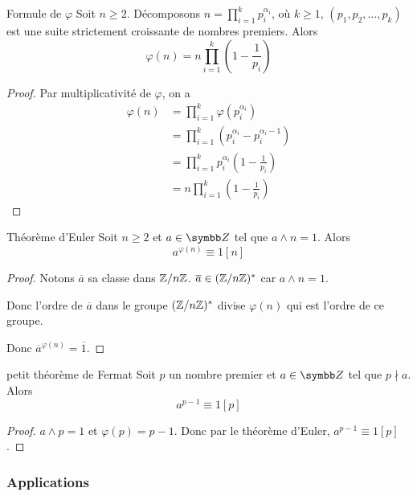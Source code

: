 \begin{theoreme}{Formule de $\varphi$}{}
    Soit $n \geqslant 2$. Décomposons $\displaystyle n = \prod_{i = 1}^k p_i^{\alpha_i}$, où 
    $k \geqslant 1$, $(p_1, p_2, \ldots, p_k)$ est une suite strictement croissante de nombres premiers. 
    Alors \[\varphi(n) = n \prod_{i = 1}^k \left(1 - \frac 1 {p_i}\right)\]
\end{theoreme}

\begin{proof}
    Par multiplicativité de $\varphi$, on a
    \begin{align*}
        \varphi(n) & = \prod_{i = 1}^k \varphi(p_i^{\alpha_i}) \\
        & = \prod_{i = 1}^k \left(p_i^{\alpha_i} - p_i^{\alpha_i - 1}\right) \\
        & = \prod_{i = 1}^k p_i^{\alpha_i} \left( 1 - \frac 1 {p_i} \right) \\
        & = n \prod_{i = 1}^k \left(1 - \frac 1 {p_i}\right)
    \end{align*}
\end{proof}

\begin{theoreme}{Théorème d'Euler}{}
    Soit $n \geqslant 2$ et $a \in \Z$ tel que $a \wedge n = 1$.
    Alors \[a^{\varphi(n)} \equiv 1 [n]\]
\end{theoreme}

\begin{proof}
    Notons $\overline a $ sa classe dans $\mathbb{Z}/n\mathbb{Z}$. $\overline a \in (\mathbb{Z}/n\mathbb{Z})^*$ car 
    $a \wedge n = 1$.

    Donc l'ordre de $\overline a$ dans le groupe $(\mathbb{Z}/n\mathbb{Z})^*$ divise $\varphi(n)$ qui 
    est l'ordre de ce groupe.

    Donc $\overline a^{\varphi(n)} = \overline 1$.
\end{proof}

\begin{corollaire}{petit théorème de Fermat}{}
    Soit $p$ un nombre premier et $a \in \Z$ tel que $p \nmid a$.
    Alors \[a^{p - 1} \equiv 1 [p]\]
\end{corollaire}

\begin{proof}
    $a \wedge p = 1$ et $\varphi(p) = p - 1$.
    Donc par le théorème d'Euler, $a^{p - 1} \equiv 1 [p]$.
\end{proof}

\subsubsection{Applications }

